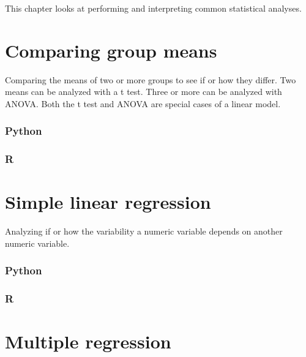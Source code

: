 \documentclass[
]{book}
\begin{document}
This chapter looks at performing and interpreting common statistical analyses.

\hypertarget{comparing-group-means}{%
\section{Comparing group means}\label{comparing-group-means}}

Comparing the means of two or more groups to see if or how they differ. Two means can be analyzed with a t test. Three or more can be analyzed with ANOVA. Both the t test and ANOVA are special cases of a linear model.

\hypertarget{python-35}{%
\subsubsection*{Python}\label{python-35}}

\hypertarget{r-35}{%
\subsubsection*{R}\label{r-35}}

\hypertarget{simple-linear-regression}{%
\section{Simple linear regression}\label{simple-linear-regression}}

Analyzing if or how the variability a numeric variable depends on another numeric variable.

\hypertarget{python-36}{%
\subsubsection*{Python}\label{python-36}}

\hypertarget{r-36}{%
\subsubsection*{R}\label{r-36}}

\hypertarget{multiple-regression}{%
\section{Multiple regression}\label{multiple-regression}}
\end{document}

